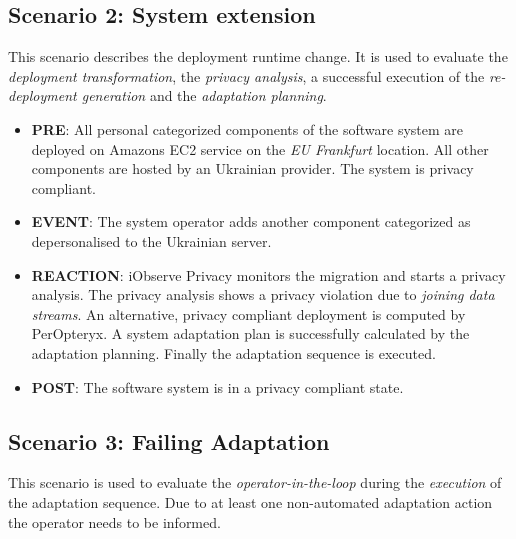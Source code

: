\subsection{Scenario 2: System extension}
\label{eval:scenario:2}

This scenario describes the deployment runtime change. It is used to evaluate the \textit{deployment transformation}, the \textit{privacy analysis}, a successful execution of the \textit{re-deployment generation} and the \textit{adaptation planning}.

\begin{itemize}
	\setlength\itemsep{0em}
	\item \textbf{PRE}: All personal categorized components of the software system are deployed on Amazons EC2 service on the \textit{EU Frankfurt} location. All other components are hosted by an Ukrainian provider. The system is privacy compliant.
	\item \textbf{EVENT}: The system operator adds another component categorized as depersonalised to the Ukrainian server.
	\item \textbf{REACTION}: iObserve Privacy monitors the migration and starts a privacy analysis. The privacy analysis shows a privacy violation due to \textit{joining data streams}. An alternative, privacy compliant deployment is computed by PerOpteryx. A system adaptation plan is successfully calculated by the adaptation planning. Finally the adaptation sequence is executed.
	\item \textbf{POST}: The software system is in a privacy compliant state.
\end{itemize}

\subsection{Scenario 3: Failing Adaptation}
\label{eval:scenario:3}
This scenario is used to evaluate the \textit{operator-in-the-loop} during the \textit{execution} of the adaptation sequence. Due to at least one non-automated adaptation action the operator needs to be informed.

